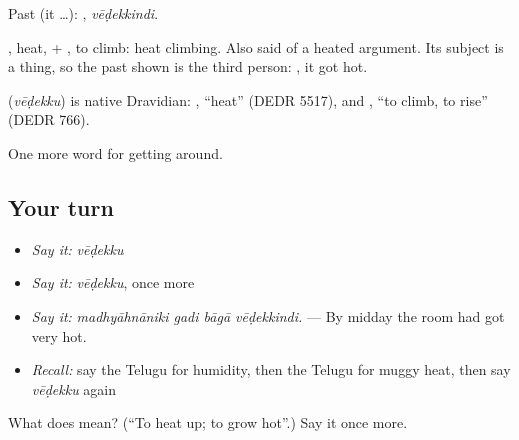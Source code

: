 Past (it …): , \emph{vēḍekkindi}.

, heat, + , to climb: heat climbing. Also said of a heated argument. Its subject is a thing, so the past shown is the third person: , it got hot.

\begin{cousinweb}
\textbf{} (\emph{vēḍekku}) is native Dravidian: , \textquotedblleft{}heat\textquotedblright{} (DEDR 5517), and , \textquotedblleft{}to climb, to rise\textquotedblright{} (DEDR 766).
\end{cousinweb}

\begin{grammarlens}[title={What you've built}]
One more word for getting around.
\end{grammarlens}

\subsection*{Your turn}
\begin{itemize}
\raggedright
  \item \emph{Say it:} \emph{vēḍekku}
  \item \emph{Say it:} \emph{vēḍekku}, once more
  \item \emph{Say it:} \emph{madhyāhnāniki gadi bāgā vēḍekkindi.} — By midday the room had got very hot.
  \item \emph{Recall:} say the Telugu for humidity, then the Telugu for muggy heat, then say \emph{vēḍekku} again
\end{itemize}

\begin{tcolorbox}[breakable,colback=teal!4,colframe=teal!35!black,title={Before you move on}]
What does  mean? (\textquotedblleft{}To heat up; to grow hot\textquotedblright{}.) Say it once more.
\end{tcolorbox}
